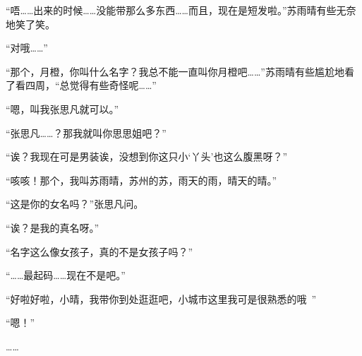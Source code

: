 “唔……出来的时候……没能带那么多东西……而且，现在是短发啦。”苏雨晴有些无奈地笑了笑。

“对哦……”

“那个，月橙，你叫什么名字？我总不能一直叫你月橙吧……”苏雨晴有些尴尬地看了看四周，“总觉得有些奇怪呢……”

“嗯，叫我张思凡就可以。”

“张思凡……？那我就叫你思思姐吧？”

“诶？我现在可是男装诶，没想到你这只小‘丫头’也这么腹黑呀？”

“咳咳！那个，我叫苏雨晴，苏州的苏，雨天的雨，晴天的晴。”

“这是你的女名吗？”张思凡问。

“诶？是我的真名呀。”

“名字这么像女孩子，真的不是女孩子吗？”

“……最起码……现在不是吧。”

“好啦好啦，小晴，我带你到处逛逛吧，小城市这里我可是很熟悉的哦~”

“嗯！”

……
